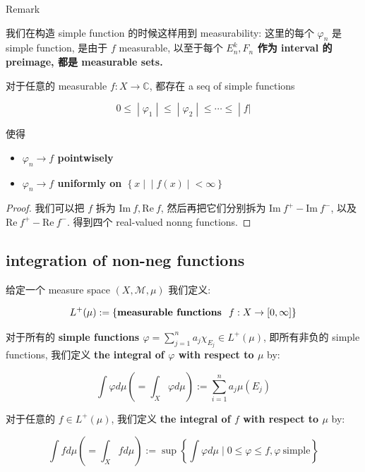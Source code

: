 \begin{qlremark}{Remark}

我们在构造 simple function 的时候这样用到 measurability: 这里的每个 \(\varphi_{n}\) 是 simple function, 是由于 \(f\) measurable, 以至于每个 \textbf{\(E_{n}^{k},F_{n}\) 作为 interval 的 preimage, 都是 measurable sets.}

\end{qlremark}

\begin{corollary}{}

对于任意的 measurable \(f:X\rightarrow\mathbb{C}\), 都存在 a seq of simple functions

\[\left. 0 \leq \middle| \varphi_{1} \middle| \leq \middle| \varphi_{2} \middle| \leq \cdots \leq \middle| f| \right.\]

使得

\begin{itemize}
\item
  \textbf{\(\varphi_{n}\rightarrow f\) pointwisely}
\item
  \textbf{\(\varphi_{n}\rightarrow f\) uniformly on \(\left\{ x \mid \middle| f(x) \middle| < \infty \right\}\)}
\end{itemize}

\end{corollary}

\begin{proof}

我们可以把 \(f\) 拆为 \(\text{Im}\ f,\text{Re}\ f\), 然后再把它们分别拆为 \(\text{Im}\ f^{+} - \text{Im}\ f^{-}\), 以及 \(\text{Re}\ f^{+} - \text{Re}\ f^{-}\). 得到四个 real-valued nonng functions.

\end{proof}

\subsection{integration of non-neg functions}\label{integration-of-non-neg-functions}

\begin{definition}{}

给定一个 measure space \((X,\mathcal{M},\mu)\) 我们定义:

\[L^{+}(\mu) := \left\{ {\text{\textbf{measurable functions }}\ f:X\rightarrow\lbrack 0,\infty\rbrack} \right\}\]

对于所有的 \textbf{simple functions \(\varphi = \sum_{j = 1}^{n}a_{j}\chi_{E_{j}} \in L^{+}(\mu)\)}, 即所有非负的 simple functions, 我们定义 \textbf{the integral of \(\varphi\) with respect to \(\mu\)} by:

\[\int\varphi d\mu( = \int_{X}\varphi d\mu) := \sum\limits_{i = 1}^{n}a_{j}\mu(E_{j})\]

对于任意的 \(f \in L^{+}(\mu)\), 我们定义 \textbf{the integral of \(f\) with respect to \(\mu\)} by:

\[\int fd\mu( = \int_{X}fd\mu) := \sup\left\{ {\int\varphi d\mu \mid 0 \leq \varphi \leq f,\varphi\ \text{simple}} \right\}\]

\end{definition}

